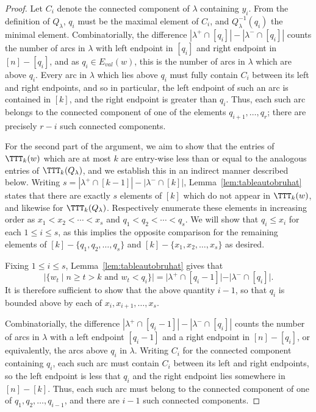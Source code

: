 \documentclass[12pt]{amsart}
\theoremstyle{definition}
\theoremstyle{remark}
\numberwithin{equation}{section}
\renewcommand{\setminus}{-}
\newcommand{\EV}{E_{val}}
\begin{document}
\begin{proof}
Let $C_{i}$ denote the connected component of $\lambda$ containing $y_{i}$.  
From the definition of $Q_{\lambda}$, $q_{i}$ must be the maximal element of $C_{i}$,  and $Q_{\lambda}^{-1}(q_{i})$ the minimal element.  
Combinatorially, the difference $|\lambda^{+} \cap [q_{i}]| - |\lambda^{-} \cap [q_{i}]|$ counts the number of arcs in $\lambda$ with left endpoint in $[q_{i}]$ and right endpoint in $[n] \setminus [q_{i}]$, and as $q_{i} \in \EV(w)$, this is the number of arcs in $\lambda$ which are above $q_{i}$.  
Every arc in $\lambda$ which lies above $q_{i}$ must fully contain $C_{i}$ between its left and right endpoints, and so in particular, the left endpoint of such an arc is contained in $[k]$, and the right endpoint is greater than $q_{i}$.  
Thus, each such arc belongs to the connected component of one of the elements $q_{i+1}, \ldots, q_{r}$; there are precisely $r - i$ such connected components.

For the second part of the argument, we aim to show that the entries of $\TTT_{k}(w)$ which are at most $k$ are entry-wise less than or equal to the analogous entries of $\TTT_{k}(Q_{\lambda})$, and we establish this in an indirect manner described below.  
Writing $s = |\lambda^{+} \cap [k-1]| - |\lambda^{-} \cap [k]|$, Lemma~\ref{lem:tableautobruhat} states that there are exactly $s$ elements of $[k]$ which do not appear in $\TTT_{k}(w)$, and likewise for $\TTT_{k}(Q_{\lambda})$.  
Respectively enumerate these elements in increasing order as $x_{1} < x_{2} < \cdots < x_{s}$ and $q_{1} < q_{2} < \cdots < q_{s}$.  
We will show that $q_{i} \le x_{i}$ for each $1 \le i \le s$, as this implies the opposite comparison for the remaining elements of $[k] \setminus \{q_{1}, q_{2}, \ldots, q_{s}\}$ and $[k] \setminus \{x_{1}, x_{2}, \ldots, x_{s}\}$ as desired.  

Fixing $1 \le i \le s$, Lemma~\ref{lem:tableautobruhat} gives that
\[
|\{ w_{t} \;|\; \text{$n \ge t > k$ and $w_{t} < q_{i}$} \}| = |\lambda^{+} \cap [q_{i} - 1]| - |\lambda^{-} \cap [q_{i}]|.
\]
It is therefore sufficient to show that the above quantity $i-1$, so that $q_{i}$ is bounded above by each of $x_{i}, x_{i+1}, \ldots, x_{s}$.

Combinatorially, the difference $|\lambda^{+} \cap [q_{i} - 1]| - |\lambda^{-} \cap [q_{i}]|$ counts the number of arcs in $\lambda$ with a left endpoint $[q_{i} -1]$ and a right endpoint in $[n] \setminus [q_{i}]$, or equivalently, the arcs above $q_{i}$ in $\lambda$.  
Writing $C_{i}$ for the connected component containing $q_{i}$, each such arc must contain $C_{i}$ between its left and right endpoints, so the left endpoint is less that $q_{i}$ and the right endpoint lies somewhere in $[n] \setminus [k]$.  
Thus, each such arc must belong to the connected component of one of $q_{1}, q_{2}, \ldots, q_{i-1}$, and there are $i-1$ such connected components.
\end{proof}
\end{document}
